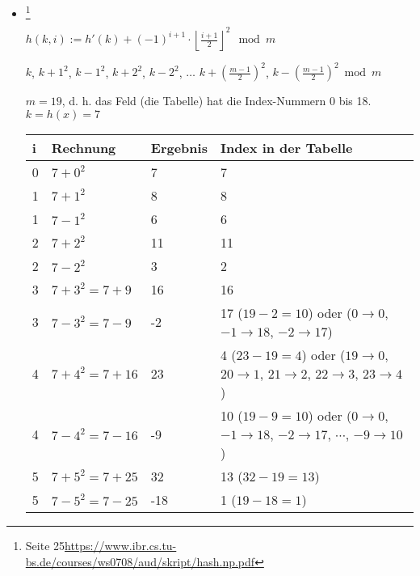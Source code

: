 \documentclass{lehramt-informatik-haupt}
\begin{document}
\begin{itemize}

%

\item {}
\footnote{Seite 25\url{https://www.ibr.cs.tu-bs.de/courses/ws0708/aud/skript/hash.np.pdf}}


$h(k, i) := h'(k) + (-1)^{i+1} \cdot \left\lfloor \frac{i+1}{2}\right\rfloor ^2 \mod m$

$k$, $k+1^2$, $k-1^2$, $k+2^2$, $k-2^2$,
$\ldots$
$k+(\frac{m-1}{2})^2$, $k-(\frac{m-1}{2})^2 \bmod m$


$m=19$, d. h. das Feld (die Tabelle) hat die Index-Nummern 0 bis 18.
$k = h(x) = 7$


\def\tmp#1{{\tiny#1}}

\begin{tabular}{|l|l|l|l|}
i & Rechnung & Ergebnis & Index in der Tabelle\\\hline\hline
0 & $7 + 0^2$ & 7 & 7\\
1 & $7 + 1^2$ & 8 & 8\\
1 & $7 - 1^2$ & 6 & 6\\
2 & $7 + 2^2$ & 11 & 11\\
2 & $7 - 2^2$ & 3 & 2 \\
3 & $7 + 3^2 = 7 + 9$  & 16 & 16 \\

3 & $7 - 3^2 = 7 - 9$  & -2 &
17 \tmp{($19-2=10$) oder ($0 \rightarrow 0$, $-1 \rightarrow 18$, $-2 \rightarrow 17$)}
\\

4 & $7 + 4^2 = 7 + 16$  & 23 &
4 \tmp{($23-19=4$) oder ($19 \rightarrow 0$, $20 \rightarrow 1$, $21 \rightarrow 2$, $22 \rightarrow 3$, $23 \rightarrow 4$)}
\\

4 & $7 - 4^2 = 7 - 16$  & -9 &
10 \tmp{($19-9=10$) oder ($0 \rightarrow 0$, $-1 \rightarrow 18$, $-2 \rightarrow 17$, $\cdots$, $-9 \rightarrow 10$)}
\\

5 & $7 + 5^2 = 7 + 25$  & 32 & 13 \tmp{($32-19=13$)} \\
5 & $7 - 5^2 = 7 - 25$  & -18 & 1 \tmp{($19-18=1$)}\\
\end{tabular}


\end{itemize}
\end{document}
